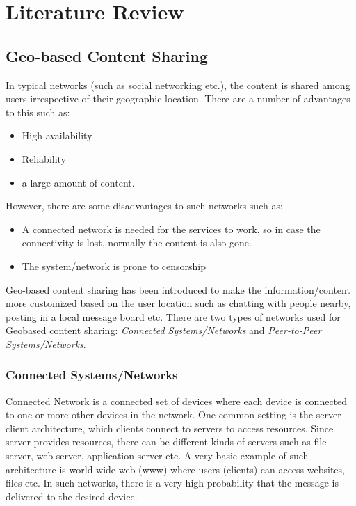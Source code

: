 
\chapter{Literature Review}\label{chapter:literature_review}

\section{Geo-based Content Sharing}
In typical networks (such as social networking etc.), the content is shared among users irrespective of their geographic location. There are a number of advantages to this such as:

\begin{itemize}
  \item High availability
  \item Reliability
  \item a large amount of content.
\end{itemize}

However, there are some disadvantages to such networks such as:

\begin{itemize}
  \item A connected network is needed for the services to work, so in case the connectivity is lost, normally the content is also gone.
  \item The system/network is prone to censorship
\end{itemize}

Geo-based content sharing has been introduced to make the information/content more customized based on the user location such as chatting with people nearby, posting in a local message board etc. There are two types of networks used for Geobased content sharing: \emph{Connected Systems/Networks} and \emph{Peer-to-Peer Systems/Networks}.

\subsection{Connected Systems/Networks}
Connected Network is a connected set of devices where each device is connected to one or more other devices in the network. One common setting is the server-client architecture, which clients connect to servers to access resources. Since server provides resources, there can be different kinds of servers such as file server, web server, application server etc. A very basic example of such architecture is world wide web (www) where users (clients) can access websites, files etc. In such networks, there is a very high probability that the message is delivered to the desired device.

